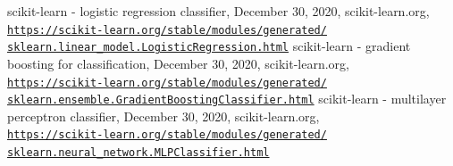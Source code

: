 \documentclass[a4paper,12pt,nottoc]{article}
\begin{document}
\begin{thebibliography}{9}
 scikit-learn - logistic regression classifier, December 30, 2020, scikit-learn.org, \\\href{https://scikit-learn.org/stable/modules/generated/sklearn.linear_model.LogisticRegression.html}{\texttt{https://scikit-learn.org/stable/modules/generated/\\sklearn.linear\_model.LogisticRegression.html}}
 scikit-learn - gradient boosting for classification, December 30, 2020, scikit-learn.org, \\\href{https://scikit-learn.org/stable/modules/generated/sklearn.ensemble.GradientBoostingClassifier.html}{\texttt{https://scikit-learn.org/stable/modules/generated/\\sklearn.ensemble.GradientBoostingClassifier.html}}
 scikit-learn - multilayer perceptron classifier, December 30, 2020, scikit-learn.org, \\\href{https://scikit-learn.org/stable/modules/generated/sklearn.neural_network.MLPClassifier.html}{\texttt{https://scikit-learn.org/stable/modules/generated/\\sklearn.neural\_network.MLPClassifier.html}}
\end{thebibliography}
\end{document}
